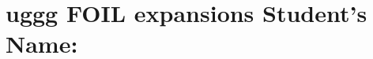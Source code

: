 \documentclass[12pt, a4paper, addpoints]{exam}
\newcommand{\gap}{\vspace{19mm}}
\newcommand{\Gap}{\vspace{38mm}}
\newcommand{\Gap}{\vspace{36mm}}
\newcommand{\uggg}{%
    \pgfmathtruncatemacro{\a}{random(2,9)} 
    \pgfmathtruncatemacro{\b}{random(2,9)} 
      \pgfmathtruncatemacro{\c}{random(2,9)} 
    \edef\result{(x + \c)(\b x +\a)}%
    \result
}
\begin{document}
\section*{uggg  FOIL expansions  \quad Student's Name: \underline{\hspace{5cm}}} 


\begin{questions}
\LARGE

\question
\gap
  
\setlength{\columnsep}{20pt}
\begin{multicols}{3}

\begin{parts}
    \part \( \uggg \)
      \Gap
       \part \( \uggg \)
    \Gap
       \part \( \uggg \)
    \Gap
       \part \( \uggg \)
    \Gap
       \part \( \uggg \)
    \Gap
       \part \( \uggg \)
    \Gap
       \part \( \uggg \)
    \Gap
       \part \( \uggg \)
    \Gap
       \part \( \uggg \)
    \Gap
           \part \( \uggg \)
    \Gap

\end{parts}
\end{multicols}
\end{questions}
\end{document}
